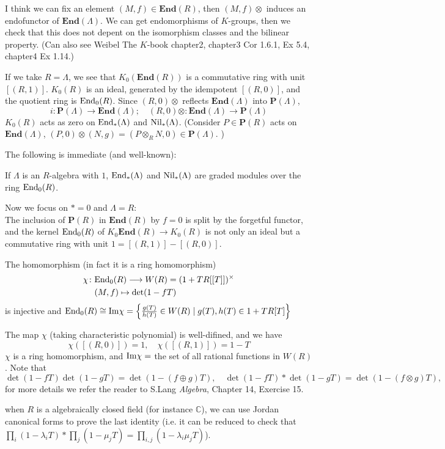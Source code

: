 I think we can fix an element $(M,f)\in \mathbf{End}(R)$, then $(M,f)\otimes$ induces an endofunctor of $\mathbf{End}(\Lambda)$. We can get endomorphisms of $K$-groups, then we check that this does not depent on the isomorphism classes and the bilinear property. (Can also see Weibel The $K$-book chapter2, chapter3 Cor 1.6.1, Ex 5.4, chapter4 Ex 1.14.)

If we take $R = \Lambda$, we see that $K_0(\mathbf{End}(R))$ is a commutative ring with unit $[(R,1)]$. $K_0(R)$ is an
ideal, generated by the idempotent $[(R,0)]$, and the quotient
ring is $\mathrm{End}_0(R)$.  Since $(R,0)\otimes$ reflects $\mathbf{End} (\Lambda)$ into $\mathbf{P} (\Lambda)$,
\[i\colon \mathbf{P} (\Lambda) \longrightarrow \mathbf{End} (\Lambda);\quad
 (R,0)\otimes\colon \mathbf{End} (\Lambda) \longrightarrow \mathbf{P} (\Lambda)\]
$K_0(R)$ acts as zero on $\mathrm{End}_*(\Lambda)$ and $\mathrm{Nil}_*(\Lambda)$. (Consider $P\in \mathbf{P}(R)$ acts on $\mathbf{End}(\Lambda)$, $(P,0)\otimes (N,g)=(P\otimes_R N,0) \in \mathbf{P}(\Lambda)$. )

The following is immediate (and well-known):
\begin{prop}\label{endmodule}
	If  $\Lambda$ is an $R$-algebra with $1$, $\mathrm{End}_*(\Lambda)$ and
$\mathrm{Nil}_*(\Lambda)$ are graded modules over the ring $\mathrm{End}_0 (R)$.
\end{prop}
Now we focus on $*=0$ and $\Lambda =R$:\\

The inclusion of $\mathbf{P}(R)$ in $\mathbf{End}(R)$ by $f = 0$ is split by the forgetful functor, and the kernel $\mathrm{End}_0 (R)$ of $K_0\mathbf{End}(R) \longrightarrow K_0 (R)$ is not only an ideal but a commutative ring with unit $1 = [(R,1)] - [(R, 0)]$.

\begin{theorem}[Almkvist]\label{Almkvist}
The homomorphism (in fact it is a ring homomorphism)
\begin{align*}
	\chi \colon&  \mathrm{End}_0(R)\longrightarrow W(R)=(1+TR[[T]])^{\times}\\
     & (M,f) \mapsto \det(1-fT)
\end{align*}
	is injective and $\mathrm{End}_0(R)\cong \mathrm{Im} \chi =\left\{\frac{g(T)}{h(T)}\in W(R)\mid g(T),h(T) \in 1+TR[T]\right\}$
\end{theorem}
The map $\chi$ (taking characteristic polynomial) is well-difined, and we have 
\[\chi([(R,0)])=1, \quad \chi([(R,1)])=1-T\]
$\chi$ is a ring homomorphism, and $\mathrm{Im} \chi =$ the set of all rational functions in $W(R)$. Note that 
\[\det (1-fT)\det(1-gT)=\det(1-(f\oplus g)T),\quad \det (1-fT)*\det(1-gT)=\det(1-(f\otimes g)T),\]
for more details we refer the reader to S.Lang {\em Algebra}, Chapter 14, Exercise 15.
\begin{remark}
	when $R$ is a algebraically closed field (for instance $\mathbb{C}$), we can use Jordan canonical forms to prove the last identity (i.e. it can be reduced to check that $\prod_i (1-\lambda_i T) * \prod_j (1-\mu_j T) =\prod_{i,j} (1-\lambda_i \mu_j T)$).
\end{remark}


